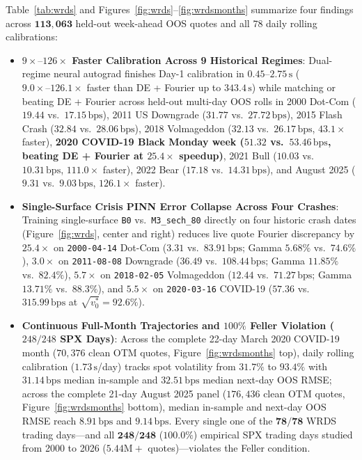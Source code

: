 \documentclass[preprint,12pt]{elsarticle}
\begin{document}
Table~\ref{tab:wrds} and Figures~\ref{fig:wrds}--\ref{fig:wrdsmonths} summarize four findings across $\mathbf{113{,}063}$ held-out week-ahead OOS quotes and all $78$ daily rolling calibrations:
\begin{itemize}
  \item \textbf{$9\times\text{--}126\times$ Faster Calibration Across 9 Historical Regimes}: Dual-regime neural autograd finishes Day-1 calibration in $\mathbf{0.45\text{--}2.75\,\mathrm{s}}$ ($\mathbf{9.0\times\text{--}126.1\times}$ faster than DE + Fourier up to $343.4\,\mathrm{s}$) while matching or beating DE + Fourier across held-out multi-day OOS rolls in 2000 Dot-Com ($\mathbf{19.44}$ vs.\ $17.15\,\mathrm{bps}$), 2011 US Downgrade ($\mathbf{31.77}$ vs.\ $27.72\,\mathrm{bps}$), 2015 Flash Crash ($\mathbf{32.84}$ vs.\ $28.06\,\mathrm{bps}$), 2018 Volmageddon ($\mathbf{32.13}$ vs.\ $26.17\,\mathrm{bps}$, $43.1\times$ faster), \textbf{2020 COVID-19 Black Monday week ($\mathbf{51.32}$ vs.\ $53.46\,\mathrm{bps}$, beating DE + Fourier at $25.4\times$ speedup)}, 2021 Bull ($\mathbf{10.03}$ vs.\ $10.31\,\mathrm{bps}$, $111.0\times$ faster), 2022 Bear ($\mathbf{17.18}$ vs.\ $14.31\,\mathrm{bps}$), and August 2025 ($\mathbf{9.31}$ vs.\ $9.03\,\mathrm{bps}$, $126.1\times$ faster).
  \item \textbf{Single-Surface Crisis PINN Error Collapse Across Four Crashes}: Training single-surface \texttt{B0} vs.\ \texttt{M3\_sech\_80} directly on four historic crash dates (Figure~\ref{fig:wrds}, center and right) reduces live quote Fourier discrepancy by $\mathbf{25.4\times}$ on \texttt{2000-04-14} Dot-Com ($\mathbf{3.31}$ vs.\ $83.91\,\mathrm{bps}$; Gamma $\mathbf{5.68\%}$ vs.\ $74.6\%$), $\mathbf{3.0\times}$ on \texttt{2011-08-08} Downgrade ($\mathbf{36.49}$ vs.\ $108.44\,\mathrm{bps}$; Gamma $\mathbf{11.85\%}$ vs.\ $82.4\%$), $\mathbf{5.7\times}$ on \texttt{2018-02-05} Volmageddon ($\mathbf{12.44}$ vs.\ $71.27\,\mathrm{bps}$; Gamma $\mathbf{13.71\%}$ vs.\ $88.3\%$), and $\mathbf{5.5\times}$ on \texttt{2020-03-16} COVID-19 ($\mathbf{57.36}$ vs.\ $315.99\,\mathrm{bps}$ at $\sqrt{v_0^*} = 92.6\%$).
  \item \textbf{Continuous Full-Month Trajectories and $100\%$ Feller Violation ($248/248$ SPX Days)}: Across the complete 22-day March 2020 COVID-19 month ($70{,}376$ clean OTM quotes, Figure~\ref{fig:wrdsmonths} top), daily rolling calibration ($1.73\,\mathrm{s}$/day) tracks spot volatility from $31.7\%$ to $93.4\%$ with $\mathbf{31.14\,\mathrm{bps}}$ median in-sample and $\mathbf{32.51\,\mathrm{bps}}$ median next-day OOS RMSE; across the complete 21-day August 2025 panel ($176{,}436$ clean OTM quotes, Figure~\ref{fig:wrdsmonths} bottom), median in-sample and next-day OOS RMSE reach $\mathbf{8.91\,\mathrm{bps}}$ and $\mathbf{9.14\,\mathrm{bps}}$. Every single one of the $\mathbf{78/78}$ WRDS trading days---and all $\mathbf{248/248}$ ($\mathbf{100.0\%}$) empirical SPX trading days studied from 2000 to 2026 ($5.44\text{M}+$ quotes)---violates the Feller condition.
\end{itemize}
\end{document}
